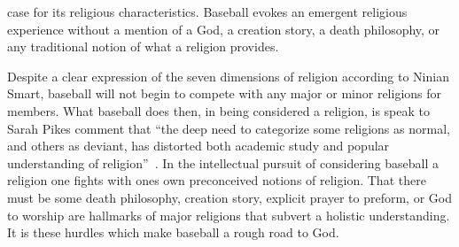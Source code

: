 \documentclass[a4paper, 12pt]{article}
\begin{document}
case for its religious characteristics. Baseball evokes an emergent religious experience without a mention of a God, a creation story, a death philosophy, or any traditional notion of what a religion provides.

Despite a clear expression of the seven dimensions of religion according to Ninian Smart, baseball will not begin to compete with any major or minor religions for members. What baseball does then, in being considered a religion, is speak to Sarah Pikes comment that ``the deep need to categorize some religions as normal, and others as deviant, has distorted both academic study and popular understanding of religion''~\autocite{vaughn_anthology_2024}. In the intellectual pursuit of considering baseball a religion one fights with ones own preconceived notions of religion. That there must be some death philosophy, creation story, explicit prayer to preform, or God to worship are hallmarks of major religions that subvert a holistic understanding. It is these hurdles which make baseball a rough road to God.

\pagebreak
\printbibliography[title={Works Cited}]
\end{document}
